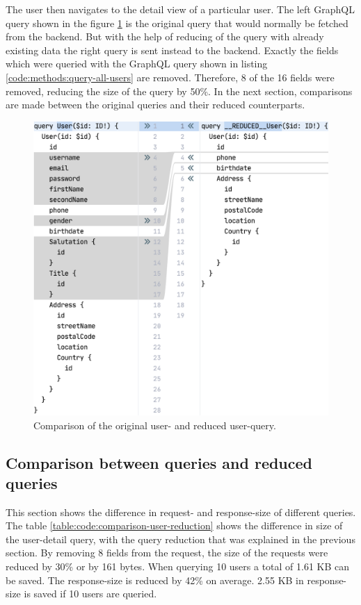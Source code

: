 The user then navigates to the detail view of a particular user. The left GraphQL query shown in the figure \ref{figure:code:comparison-user-reduced-user} is the original query that would normally be fetched from the backend. But with the help of reducing of the query with already existing data the right query is sent instead to the backend. Exactly the fields which were queried with the GraphQL query shown in listing \ref{code:methods:query-all-users} are removed. Therefore, 8 of the 16 fields were removed, reducing the size of the query by 50\%. In the next section, comparisons are made between the original queries and their reduced counterparts.

\ifshowImages
\begin{figure}[H]
\centering
\includegraphics[width=0.6\linewidth]{images/reduction-graphql-examples/compare-user-reduced-user.png}
\caption{Comparison of the original user- and reduced user-query.}\label{figure:code:comparison-user-reduced-user}
\end{figure}
\fi

\subsection{Comparison between queries and reduced queries}

This section shows the difference in request- and response-size of different queries. The table \ref{table:code:comparison-user-reduction} shows the difference in size of the user-detail query, with the query reduction that was explained in the previous section. By removing 8 fields from the request, the size of the requests were reduced by 30\% or by 161 bytes. When querying 10 users a total of 1.61 KB can be saved. The response-size is reduced by 42\% on average. 2.55 KB in response-size is saved if 10 users are queried.

